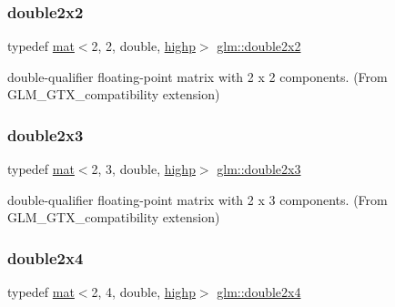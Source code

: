 \subsubsection{\texorpdfstring{double2x2}{double2x2}}
{\footnotesize\ttfamily typedef \mbox{\hyperlink{structglm_1_1mat}{mat}}$<$2, 2, double, \mbox{\hyperlink{namespaceglm_a36ed105b07c7746804d7fdc7cc90ff25ac6f7eab42eacbb10d59a58e95e362074}{highp}}$>$ \mbox{\hyperlink{group__gtx__compatibility_ga38235425d2401904456ecbc342d87453}{glm\+::double2x2}}}



double-\/qualifier floating-\/point matrix with 2 x 2 components. (From G\+L\+M\+\_\+\+G\+T\+X\+\_\+compatibility extension) 

\mbox{\label{group__gtx__compatibility_gaaf4151b4dcb70d412df4c4a1cfccd575}} 
\subsubsection{\texorpdfstring{double2x3}{double2x3}}
{\footnotesize\ttfamily typedef \mbox{\hyperlink{structglm_1_1mat}{mat}}$<$2, 3, double, \mbox{\hyperlink{namespaceglm_a36ed105b07c7746804d7fdc7cc90ff25ac6f7eab42eacbb10d59a58e95e362074}{highp}}$>$ \mbox{\hyperlink{group__gtx__compatibility_gaaf4151b4dcb70d412df4c4a1cfccd575}{glm\+::double2x3}}}



double-\/qualifier floating-\/point matrix with 2 x 3 components. (From G\+L\+M\+\_\+\+G\+T\+X\+\_\+compatibility extension) 

\mbox{\label{group__gtx__compatibility_ga64a5113afe95db296ff0593232ac772d}} 
\subsubsection{\texorpdfstring{double2x4}{double2x4}}
{\footnotesize\ttfamily typedef \mbox{\hyperlink{structglm_1_1mat}{mat}}$<$2, 4, double, \mbox{\hyperlink{namespaceglm_a36ed105b07c7746804d7fdc7cc90ff25ac6f7eab42eacbb10d59a58e95e362074}{highp}}$>$ \mbox{\hyperlink{group__gtx__compatibility_ga64a5113afe95db296ff0593232ac772d}{glm\+::double2x4}}}



